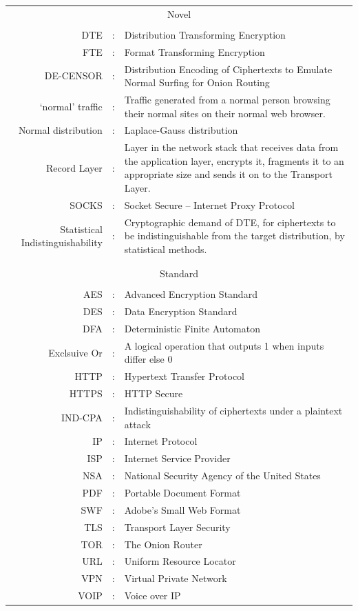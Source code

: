 \documentclass[ %
                    author={Samuel Russell},
                supervisor={Prof. Bogdan Warinschi},
                    degree={MEng},
                     title={Innocuous Ciphertexts},
                  subtitle={The DE-CENSOR Scheme},
                      type={Research},
                      year={2018} ]{dissertation}
\begin{document}
\begin{tabularx}{\textwidth}{ r c X }

\multicolumn{3}{c}{Novel}\\
&&\\
DTE					&:		& Distribution Transforming Encryption\\
FTE					&:		& Format Transforming Encryption\\
DE-CENSOR			&:		& Distribution Encoding of Ciphertexts to Emulate Normal Surfing for Onion Routing\\
`normal' traffic		&:		& Traffic generated from a normal person browsing their normal sites on their normal web browser.\\
Normal distribution &:		& Laplace-Gauss distribution\\
Record Layer		&:		& Layer in the network stack that receives data from the application layer, encrypts it, fragments it to an appropriate size and sends it on to the Transport Layer.\\
SOCKS				&:		& Socket Secure -- Internet Proxy Protocol\\
Statistical Indistinguishability&:& Cryptographic demand of DTE, for ciphertexts to be indistinguishable from the target distribution, by statistical methods.\\
&&\\
&&\\
\multicolumn{3}{c}{Standard}\\
&&\\
AES                 &:		& Advanced Encryption Standard\\
DES                 &:		& Data Encryption Standard\\
DFA					&:		& Deterministic Finite Automaton\\
Exclsuive Or		&:		& A logical operation that outputs 1 when inputs differ else 0\\
HTTP				&:		& Hypertext Transfer Protocol\\
HTTPS				&:		& HTTP Secure\\
IND-CPA				&:		& Indistinguishability of ciphertexts under a plaintext attack\\
IP					&:		& Internet Protocol\\
ISP					&:		& Internet Service Provider\\
NSA					&:		& National Security Agency of the United States\\
PDF					&:		& Portable Document Format\\
SWF					&:		& Adobe's Small Web Format\\
TLS					&:		& Transport Layer Security\\
TOR					&:		& The Onion Router\\
URL					&:		& Uniform Resource Locator\\
VPN					&:		& Virtual Private Network\\
VOIP				&:		& Voice over IP\\

\end{tabularx}
\end{document}
